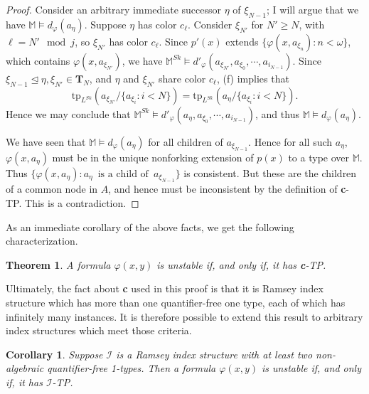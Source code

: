 \documentclass{article}
\newcommand{\bbM}{\mathbb{M}}
\newcommand{\calI}{\mathcal{I}}
\newcommand{\tp}{\text{tp}}
\newcommand{\vphi}{\varphi}
\newtheorem{theorem}{Theorem}
\newtheorem{corollary}{Corollary}
\theoremstyle{definition}
\theoremstyle{definition}
\theoremstyle{definition}
\theoremstyle{definition}
\begin{document}
\begin{proof}
    Consider an arbitrary immediate successor $\eta$ of $\xi_{N-1}$; I will argue that we have $\bbM\models d_\vphi (a_\eta)$. Suppose $\eta$ has color $c_\ell$. Consider $\xi_{N'}$ for $N'\geq N$, with $\ell=N'\mod j$, so $\xi_{N'}$ has color $c_\ell$. Since $p'(x)$ extends $\{\vphi(x, a_{\xi_n})\colon n<\omega\}$, which contains $\vphi(x, a_{\xi_{N'}})$, we have $\bbM^{Sk}\models d'_\vphi(a_{\xi_{N'}},a_{\xi_0},\dotsm, a_{i_{N-1}})$. Since $\xi_{N-1}\trianglelefteq \eta, \xi_{N'}\in \textbf{T}_N$, and $\eta$ and $\xi_{N'}$ share color $c_\ell$, (f) implies that $$\tp_{L^{Sk}}(a_{\xi_{N'}}/\{a_{\xi_i}\colon i<N\})=\tp_{L^{Sk}}(a_{\eta}/\{a_{\xi_i}\colon i<N\}).$$
    Hence we may conclude that $\bbM^{Sk}\models d'_\vphi(a_\eta,a_{\xi_0},\dotsm, a_{i_{N-1}})$, and thus $\bbM\models d_\vphi(a_\eta)$. 
    

    We have seen that $\bbM\models d_\vphi(a_\eta)$ for all children of $a_{\xi_{N-1}}$. Hence for all such $a_\eta$, $\vphi(x,a_\eta)$ must be in the unique nonforking extension of $p(x)$ to a type over $\bbM$. Thus $\{\vphi(x, a_\eta)\colon a_\eta\enspace\text{is a child of}\enspace a_{\xi_{N-1}}\}$ is consistent. But these are the children of a common node in $A$, and hence must be inconsistent by the definition of \textbf{c}-TP. This is a contradiction. 
\end{proof}

As an immediate corollary of the above facts, we get the following characterization.

\begin{theorem}
    A formula $\vphi(x,y)$ is unstable if, and only if, it has \textbf{c}-TP.
\end{theorem}

Ultimately, the fact about \textbf{c} used in this proof is that it is Ramsey index structure which has more than one quantifier-free one type, each of which has infinitely many instances. It is therefore possible to extend this result to arbitrary index structures which meet those criteria.

\begin{corollary}\label{generalized stability characterization}
    Suppose $\calI$ is a Ramsey index structure with at least two non-algebraic quantifier-free 1-types. Then a formula $\vphi(x,y)$ is unstable if, and only if, it has $\calI$-TP.
\end{corollary}
\end{document}
